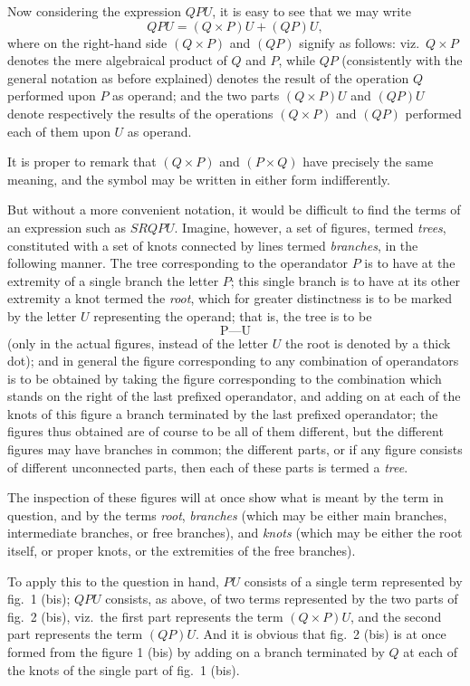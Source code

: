 \documentclass[11pt,a4paper]{book}
\begin{document}
{{Now considering the expression $QPU$, it is easy to see that we may write
\[
QPU = (Q \times P)U + (QP)U,
\]
where on the right-hand side $(Q \times P)$ and $(QP)$ signify as follows: viz.\ $Q \times P$ denotes the mere algebraical product of $Q$ and $P$, while $QP$ (consistently with the general notation as before explained) denotes the result of the operation $Q$ performed upon $P$ as operand; and the two parts $(Q \times P)U$ and $(QP)U$ denote respectively the results of the operations $(Q \times P)$ and $(QP)$ performed each of them upon $U$ as operand.

It is proper to remark that $(Q \times P)$ and $(P \times Q)$ have precisely the same meaning, and the symbol may be written in either form indifferently.

But without a more convenient notation, it would be difficult to find the terms of an expression such as $SRQPU$. Imagine, however, a set of figures, termed \textit{trees}, constituted with a set of knots connected by lines termed \textit{branches}, in the following manner. The tree corresponding to the operandator $P$ is to have at the extremity of a single branch the letter $P$; this single branch is to have at its other extremity a knot termed the \textit{root}, which for greater distinctness is to be marked by the letter $U$ representing the operand; that is, the tree is to be
\[
\text{P---U}
\]
(only in the actual figures, instead of the letter $U$ the root is denoted by a thick dot); and in general the figure corresponding to any combination of operandators is to be obtained by taking the figure corresponding to the combination which stands on the right of the last prefixed operandator, and adding on at each of the knots of this figure a branch terminated by the last prefixed operandator; the figures thus obtained are of course to be all of them different, but the different figures may have branches in common; the different parts, or if any figure consists of different unconnected parts, then each of these parts is termed a \textit{tree}.

The inspection of these figures will at once show what is meant by the term in question, and by the terms \textit{root}, \textit{branches} (which may be either main branches, intermediate branches, or free branches), and \textit{knots} (which may be either the root itself, or proper knots, or the extremities of the free branches).

To apply this to the question in hand, $PU$ consists of a single term represented by fig.~1 (bis); $QPU$ consists, as above, of two terms represented by the two parts of fig.~2 (bis), viz.\ the first part represents the term $(Q \times P)U$, and the second part represents the term $(QP)U$. And it is obvious that fig.~2 (bis) is at once formed from the figure 1 (bis) by adding on a branch terminated by $Q$ at each of the knots of the single part of fig.~1 (bis).

}}
\end{document}
